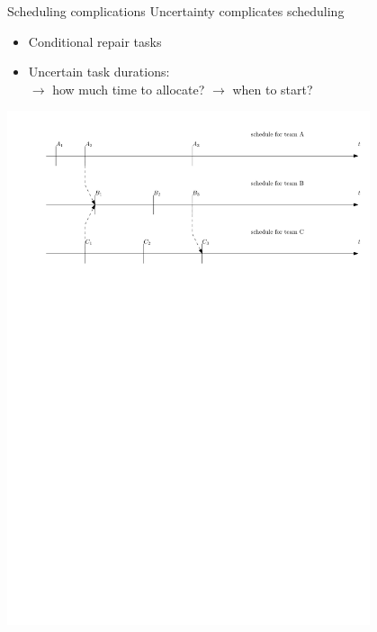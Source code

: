 \begin{frame}{Scheduling complications}
	Uncertainty complicates scheduling
	\begin{itemize}
		\item Conditional repair tasks
		\item Uncertain task durations: \\
			$\rightarrow$ how much time to allocate? $\rightarrow$ when to start?
	\end{itemize}

	\medskip

	\begin{center}
		\includegraphics[width=0.8\textwidth]{team-schedules}
	\end{center}

	\medskip

\end{frame}

